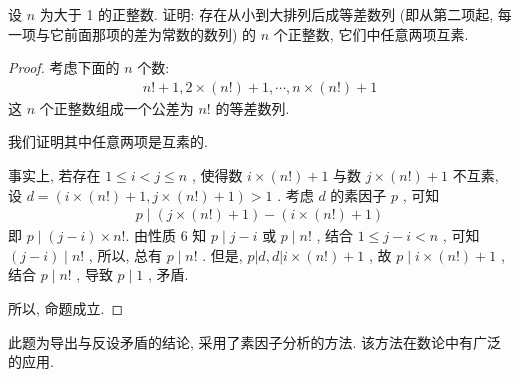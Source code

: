 \begin{example}
	设 $n$ 为大于 1 的正整数. 证明: 存在从小到大排列后成等差数列 (即从第二项起, 每一项与它前面那项的差为常数的数列) 的 $n$ 个正整数, 它们中任意两项互素.
\end{example}
\begin{proof}
	考虑下面的 $n$ 个数:
	\begin{align*}
		n!+1,2 \times(n!)+1, \cdots, n \times(n!)+1
	\end{align*}
	这 $n$ 个正整数组成一个公差为 $n!$ 的等差数列.

	我们证明其中任意两项是互素的.

	事实上, 若存在 $1 \leqslant i<j \leqslant n$ , 使得数 $i \times(n!)+1$ 与数 $j \times(n!)+1$ 不互素, 设 $d=(i \times(n!)+1, j \times(n!)+1)>1$ . 考虑 $d$ 的素因子 $p$ , 可知
	\begin{align*}
		p \mid(j \times(n!)+1)-(i \times(n!)+1)
	\end{align*}
	即 $p \mid(j-i) \times n!$. 由性质 6 知 $p \mid j-i$ 或 $p \mid n!$ , 结合 $1 \leqslant j-i<n$ , 可知 $(j-i) \mid n!$ , 所以, 总有 $p \mid n!$ . 但是,  $p|d, d| i \times(n!)+1$ , 故 $p \mid i \times(n!)+1$ , 结合 $p \mid n!$ , 导致 $p \mid 1$ , 矛盾.

	所以, 命题成立.
\end{proof}
\begin{note}
	此题为导出与反设矛盾的结论, 采用了素因子分析的方法. 该方法在数论中有广泛的应用.
\end{note}

